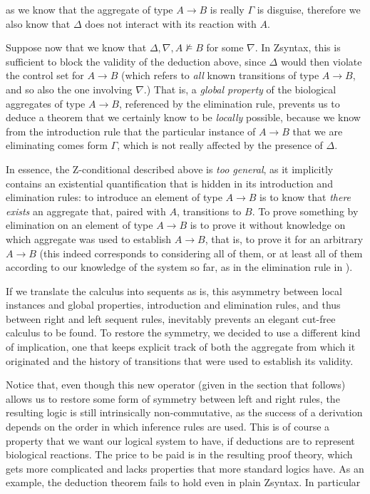 as we know that the aggregate of type $A \rightarrow B$ is really $\Gamma$ is
disguise, therefore we also know that $\Delta$ does not interact with its
reaction with $A$.

Suppose now that we know that $\Delta, \nabla, A \not \models B$ for some
$\nabla$. In Zsyntax, this is sufficient to block the validity of the deduction
above, since $\Delta$ would then violate the control set for $A \rightarrow B$
(which refers to \emph{all} known transitions of type $A \rightarrow B$, and so
also the one involving $\nabla$.) That is, a \emph{global property} of the
biological aggregates of type $A \rightarrow B$, referenced by the elimination
rule, prevents us to deduce a theorem that we certainly know to be
\emph{locally} possible, because we know from the introduction rule that the
particular instance of $A \rightarrow B$ that we are eliminating comes form
$\Gamma$, which is not really affected by the presence of $\Delta$.

In essence, the Z-conditional described above is \emph{too general}, as it
implicitly contains an existential quantification that is hidden in its
introduction and elimination rules: to introduce an element of
type $A \rightarrow B$ is to know that \emph{there exists} an aggregate that,
paired with $A$, transitions to $B$. To prove something by elimination on an
element of type $A \rightarrow B$ is to prove it without knowledge on which
aggregate was used to establish $A \rightarrow B$, that is, to prove it for an
arbitrary $A \rightarrow B$ (this indeed corresponds to considering all of them,
or at least all of them according to our knowledge of the system so far, as in
the elimination rule in \cite{adding-logic}).

If we translate the calculus into sequents as is, this asymmetry between local
instances and global properties, introduction and elimination rules, and thus
between right and left sequent rules, inevitably prevents an elegant cut-free
calculus to be found. To restore the symmetry, we decided to use a different
kind of implication, one that keeps explicit track of both the aggregate from
which it originated and the history of transitions that were used to establish
its validity.

Notice that, even though this new operator (given in the section that follows)
allows us to restore some form of symmetry between left and right rules, the
resulting logic is still intrinsically non-commutative, as the success of a
derivation depends on the order in which inference rules are used. This is of
course a property that we want our logical system to have, if deductions are to
represent biological reactions. The price to be paid is in the resulting proof
theory, which gets more complicated and lacks properties that more standard
logics have. As an example, the deduction theorem fails to hold even in plain
Zsyntax. In particular

